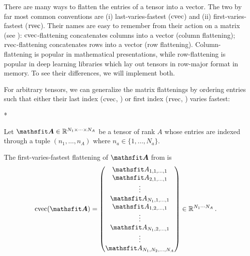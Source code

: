 There are many ways to flatten the entries of a tensor into a vector.
The two by far most common conventions are (i) last-varies-fastest ($\operatorname{cvec}$) and (ii) first-varies-fastest ($\operatorname{rvec}$).
Their names are easy to remember from their action on a matrix (see ): $\operatorname{cvec}$-flattening concatenates columns into a vector (column flattening); $\operatorname{rvec}$-flattening concatenates rows into a vector (row flattening).
Column-flattening is popular in mathematical presentations, while row-flattening is popular in deep learning libraries which lay out tensors in row-major format in memory.
To see their differences, we will implement both.

For arbitrary tensors, we can generalize the matrix flattenings by ordering entries such that either their last index ($\operatorname{cvec}$, ) or first index ($\operatorname{rvec}$, ) varies fastest:

\switchcolumn[1]*
\switchcolumn[0]

\begin{setup}\label{setup:flattening}
  Let $\tA \in \sR^{N_1 \times \dots \times N_A}$ be a tensor of rank $A$ whose entries are indexed through a tuple $(n_1, \dots, n_A)$ where $n_a \in \{1, \dots, N_a\}$.
\end{setup}
\begin{definition}\label{def:cvec}
  The first-varies-fastest flattening of $\tA$ from  is
  \begin{align*}
    \cvec(\tA) =
    \begin{pmatrix}
      \etA_{1,1,\dots,1} \\
      \etA_{2,1,\dots,1} \\
      \vdots \\
      \etA_{N_1,1,\dots,1} \\
      \etA_{1,2,\dots,1} \\
      \vdots \\
      \etA_{N_1,2,\dots,1} \\
      \vdots \\
      \etA_{N_1,N_2,\dots,N_A}
    \end{pmatrix}
    \in \sR ^{N_1 \cdots N_A}\,.
  \end{align*}
\end{definition}

